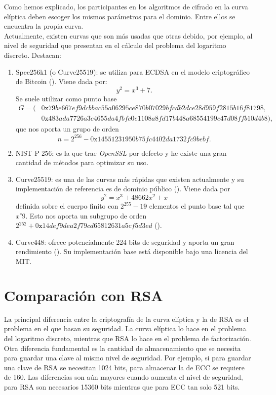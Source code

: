 \documentclass[11pt]{article}
\begin{document}
Como hemos explicado, los participantes en los algoritmos de cifrado en la curva elíptica deben escoger los mismos parámetros para el dominio. Entre ellos se encuentra la propia curva.\\

Actualmente, existen curvas que son más usadas que otras debido, por ejemplo, al nivel de seguridad que presentan en el cálculo del problema del logaritmo discreto. Destacan:
\begin{enumerate}
\item Spec256k1 (o Curve25519): se utiliza para ECDSA en el modelo criptográfico de Bitcoin (\cite{Secp256k1}). Viene dada por:
\[
y^2 = x^3 + 7.
\]
Se suele utilizar como punto base
\begin{equation*}
\begin{split}
G = (&0\texttt{x}79be667ef9dcbbac55a06295ce870b07029bfcdb2dce28d959f2815b16f81798, \\
		&0\texttt{x}483ada7726a3c4655da4fbfc0e1108a8fd17b448a68554199c47d08ffb10d4b8),
\end{split}
\end{equation*}
que nos aporta un grupo de orden
\[
n =2^{256}-0\texttt{x}14551231950b75fc4402da1732fc9bebf.
\]

\item NIST P-256: es la que trae \textit{OpenSSL} por defecto y he existe una gran cantidad de métodos para optimizar su uso. \\

\item Curve25519: es una de las curvas más rápidas que existen actualmente y su implementación de referencia es de dominio público (\cite{langley_elliptic_nodate}). Viene dada por
\[
y^2 = x^3 + 48662x^2 + x
\]
definida sobre el cuerpo finito con $ 2^{255} - 19 $ elementos el punto base tal que $ x ⁼ 9 $. Esto nos aporta un subgrupo de orden $ 2{^252 }+ 0\texttt{x}14def9dea2f79cd65812631a5cf5d3ed $ (\cite{curve25519}). \\

\item  Curve448: ofrece potencialmente 224 bits de seguridad y aporta un gran rendimiento (\cite{curve448}). Su implementación base está disponible bajo una licencia del MIT. \\
\end{enumerate}
\section{Comparación con RSA}
\label{sec:RSA}
La principal diferencia entre la criptografía de la curva elíptica y la de RSA es el problema en el que basan su seguridad. La curva elíptica lo hace en el problema del logaritmo discreto, mientras que RSA lo hace en el problema de factorización. Otra diferencia fundamental es la cantidad de almacenamiento que se necesita para guardar una clave al mismo nivel de seguridad. Por ejemplo, si para guardar una clave de RSA se necesitan 1024 bits, para almacenar la de ECC se requiere de 160. Las diferencias son aún mayores cuando aumenta el nivel de seguridad, para RSA son necesarios 15360 bits mientras que para ECC tan solo 521 bits.\\ %
\end{document}
